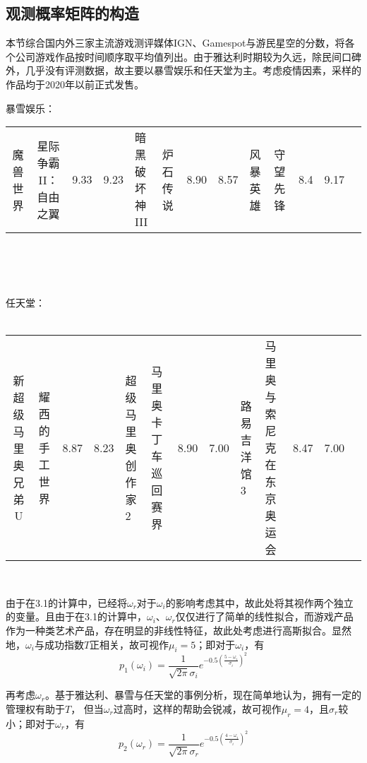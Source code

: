 \documentclass[hyperref]{ctexart}
\begin{document}
\begin{multicols}{2}
    \subsection{观测概率矩阵的构造}
	    本节综合国内外三家主流游戏测评媒体IGN、Gamespot与游民星空的分数，将各个公司游戏作品按时间顺序取平均值列出。由于雅达利时期较为久远，除民间口碑外，几乎没有评测数据，故主要以暴雪娱乐和任天堂为主。考虑疫情因素，采样的作品均于2020年以前正式发售。\\ \par
	   暴雪娱乐：\\\par
    \begin{tabular}{|c|c|}
    \hline
    魔兽世界 & 星际争霸II：自由之翼 & 9.33&9.23&
    \hline
    暗黑破坏神III&炉石传说&8.90& 8.57&
    \hline
    风暴英雄&守望先锋&8.4&9.17&
    \hline
    \end{tabular}\\ \\ \\ \par
    任天堂：\\ \\
     \begin{tabular}{|c|c|}
    \hline
    新超级马里奥兄弟U & 耀西的手工世界 & 8.87&8.23&
    \hline
    超级马里奥创作家2&马里奥卡丁车巡回赛界&8.90& 7.00&
    \hline
    路易吉洋馆3&马里奥与索尼克在东京奥运会&8.47&7.00&
    \hline
    \end{tabular}\\ \par
    由于在3.1的计算中，已经将$\omega_r$对于$\omega_i$的影响考虑其中，故此处将其视作两个独立的变量。且由于在3.1的计算中，$\omega_i$、$\omega_r$仅仅进行了简单的线性拟合，而游戏产品作为一种类艺术产品，存在明显的非线性特征，故此处考虑进行高斯拟合。显然地，$\omega_i$与成功指数$T$正相关，故可视作$\mu_i = 5$；即对于$\omega_i$，有
    \begin{equation}
        p_1(\omega_i) = \frac{1}{\sqrt{2\pi}\sigma_i}e^{-0.5(\frac{5 - \omega_i}{\sigma_i})^2}
    \end{equation}\par
    再考虑$\omega_r$。基于雅达利、暴雪与任天堂的事例分析，现在简单地认为，拥有一定的管理权有助于$T$， 但当$\omega_r$过高时，这样的帮助会锐减，故可视作$\mu_r = 4$，且$\sigma_r$较小；即对于$\omega_r$，有
    \begin{equation}
        p_2(\omega_r) = \frac{1}{\sqrt{2\pi}\sigma_r}e^{-0.5(\frac{4
        - \omega_i}{\sigma_i})^2}
    \end{equation}\par

\end{multicols}
\end{document}
